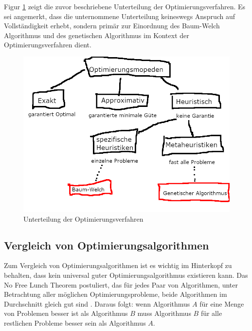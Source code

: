 Figur \ref{fig:optimierungsverfahren} zeigt die zuvor beschriebene Unterteilung der Optimierungsverfahren. Es sei angemerkt, dass die unternommene Unterteilung keineswegs Anspruch auf Vollständigkeit erhebt, sondern primär zur Einordnung des Baum-Welch Algorithmus und des genetischen Algorithmus im Kontext der Optimierungsverfahren dient.
\begin{figure}[h!]
    \includegraphics[scale=1.0]{images/Unterteilung_Optimierungsverfahren.png}
    \caption{Unterteilung der Optimierungsverfahren}
    \label{fig:optimierungsverfahren}
\end{figure}

\subsection*{Vergleich von Optimierungsalgorithmen}
Zum Vergleich von Optimierungsalgorithmen ist es wichtig im Hinterkopf zu behalten, dass kein universal guter Optimierungsalgorithmus existieren kann. Das No Free Lunch Theorem postuliert, das für jedes Paar von Algorithmen, unter Betrachtung aller möglichen Optimierungsprobleme, beide Algorithmen im Durchschnitt gleich gut sind \cite*{NFL}. Daraus folgt: wenn Algorithmus $A$ für eine Menge von Problemen besser ist als Algorithmus $B$ muss Algorithmus $B$ für alle restlichen Probleme besser sein als Algorithmus $A$.